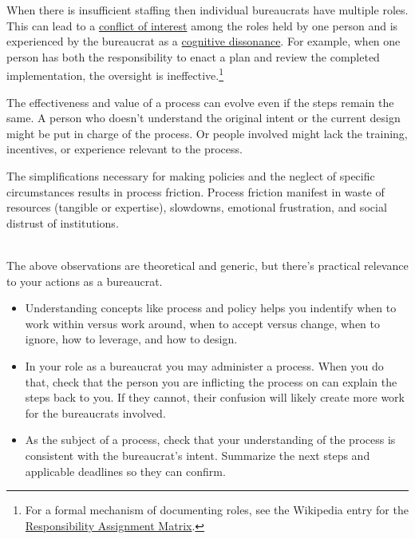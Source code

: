 When there is insufficient staffing then individual bureaucrats have multiple roles. This can lead to a 
\href{https://en.wikipedia.org/wiki/Conflict_of_interest}{conflict of interest}  
among the roles held by one person and is experienced by the bureaucrat as a \href{https://en.wikipedia.org/wiki/Cognitive_dissonance}{cognitive dissonance}. 
For example, when one person has both the responsibility to enact a plan and review the completed implementation, the oversight is ineffective.\footnote{For a formal mechanism of documenting roles, see the Wikipedia entry for the 
\href{https://en.wikipedia.org/wiki/Responsibility_assignment_matrix}{Responsibility Assignment Matrix}.
}

The effectiveness and value of a process can evolve even if the steps remain the same. 
A person who doesn't understand the original intent or the current design might be put in charge of the process. Or people involved might lack the training, incentives, or experience relevant to the process. 


The simplifications necessary for making policies and the neglect of specific circumstances results in \gls{process friction}. Process friction manifest in waste of resources (tangible or expertise), slowdowns, emotional frustration, and social distrust of institutions.

\ \\

The above observations are theoretical and generic, but there's practical relevance to your actions as a bureaucrat.
\begin{itemize}
    \item Understanding concepts like process and policy helps you indentify when to work within versus work around, when to accept versus change, when to ignore, how to leverage, and how to design.
    \item In your role as a bureaucrat you may administer a process. When you do that, check that the person you are inflicting the process on can explain the steps back to you. If they cannot, their confusion will likely create more work for the bureaucrats involved. 
%
    \item As the subject of a process, check that your understanding of the process is consistent with the bureaucrat's intent. Summarize the next steps and applicable deadlines so they can confirm. 
\end{itemize}


